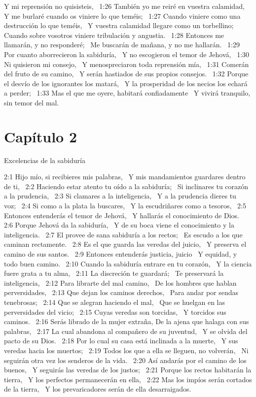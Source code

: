 Y mi reprensión no quisisteis,  
1:26 También yo me reiré en vuestra calamidad,  
Y me burlaré cuando os viniere lo que teméis;  
1:27 Cuando viniere como una destrucción lo que teméis,  
Y vuestra calamidad llegare como un torbellino;  
Cuando sobre vosotros viniere tribulación y angustia.  
1:28 Entonces me llamarán, y no responderé;  
Me buscarán de mañana, y no me hallarán.  
1:29 Por cuanto aborrecieron la sabiduría,  
Y no escogieron el temor de Jehová,  
1:30 Ni quisieron mi consejo,  
Y menospreciaron toda reprensión mía,  
1:31 Comerán del fruto de su camino,  
Y serán hastiados de sus propios consejos.  
1:32 Porque el desvío de los ignorantes los matará,  
Y la prosperidad de los necios los echará a perder;  
1:33 Mas el que me oyere, habitará confiadamente  
Y vivirá tranquilo, sin temor del mal.  
\section*{Capítulo 2 }
Excelencias de la sabiduría  

2:1 Hijo mío, si recibieres mis palabras,  
Y mis mandamientos guardares dentro de ti,  
2:2 Haciendo estar atento tu oído a la sabiduría;  
Si inclinares tu corazón a la prudencia,  
2:3 Si clamares a la inteligencia,  
Y a la prudencia dieres tu voz;  
2:4 Si como a la plata la buscares,  
Y la escudriñares como a tesoros,  
2:5 Entonces entenderás el temor de Jehová,  
Y hallarás el conocimiento de Dios.  
2:6 Porque Jehová da la sabiduría,  
Y de su boca viene el conocimiento y la inteligencia.  
2:7 El provee de sana sabiduría a los rectos;  
Es escudo a los que caminan rectamente.  
2:8 Es el que guarda las veredas del juicio,  
Y preserva el camino de sus santos.  
2:9 Entonces entenderás justicia, juicio  
Y equidad, y todo buen camino.  
2:10 Cuando la sabiduría entrare en tu corazón,  
Y la ciencia fuere grata a tu alma,  
2:11 La discreción te guardará;  
Te preservará la inteligencia,  
2:12 Para librarte del mal camino,  
De los hombres que hablan perversidades,  
2:13 Que dejan los caminos derechos,  
Para andar por sendas tenebrosas;  
2:14 Que se alegran haciendo el mal,  
Que se huelgan en las perversidades del vicio;  
2:15 Cuyas veredas son torcidas,  
Y torcidos sus caminos.  
2:16 Serás librado de la mujer extraña, 
De la ajena que halaga con sus palabras,  
2:17 La cual abandona al compañero de su juventud,  
Y se olvida del pacto de su Dios.  
2:18 Por lo cual su casa está inclinada a la muerte,  
Y sus veredas hacia los muertos;  
2:19 Todos los que a ella se lleguen, no volverán,  
Ni seguirán otra vez los senderos de la vida.  
2:20 Así andarás por el camino de los buenos,  
Y seguirás las veredas de los justos;  
2:21 Porque los rectos habitarán la tierra,  
Y los perfectos permanecerán en ella,  
2:22 Mas los impíos serán cortados de la tierra,  
Y los prevaricadores serán de ella desarraigados.  
